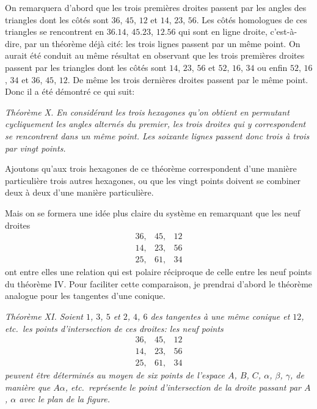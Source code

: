 \documentclass[12pt,a4paper]{article}
\theoremstyle{plain}
\begin{document}
On remarquera d'abord que les trois premi\`eres droites passent par les angles des triangles dont les c\^ot\'es sont $36$, $45$, $12$ et $14$, $23$, $56$. Les c\^ot\'es homologues de ces triangles se rencontrent en $36.14$, $45.23$, $12.56$ qui sont en ligne droite, c'est-\`a-dire, par un th\'eor\`eme d\'ej\`a cit\'e: les trois lignes passent par un m\^eme point. On aurait \'et\'e conduit au m\^eme r\'esultat en observant que les trois premi\`eres droites passent par les triangles dont les c\^ot\'es sont $14$, $23$, $56$ et $52$, $16$, $34$ ou enfin $52$, $16$, $34$ et $36$, $45$, $12$. De m\^eme les trois derni\`eres droites passent par le m\^eme point. Donc il a \'et\'e d\'emontr\'e ce qui suit:

\smallskip
\textit{Th\'eor\`eme X. En consid\'erant les trois hexagones qu'on obtient en permutant cycliquement les angles altern\'es du premier, les trois droites qui y correspondent se rencontrent dans un m\^eme point. Les soixante lignes passent donc trois \`a trois par vingt points.}
\smallskip

Ajoutons qu'aux trois hexagones de ce th\'eor\`eme correspondent d'une mani\`ere particuli\`ere trois autres hexagones, ou que les vingt points doivent se combiner deux \`a deux d'une mani\`ere particuli\`ere.

Mais on se formera une id\'ee plus claire du syst\`eme en remarquant que les neuf droites
\[
\begin{array}{ccc}
36, & 45, & 12 \\
14, & 23, & 56 \\
25, & 61, & 34
\end{array}
\]
ont entre elles une relation qui est polaire r\'eciproque de celle entre les neuf points du th\'eor\`eme IV. Pour faciliter cette comparaison, je prendrai d'abord le th\'eor\`eme analogue pour les tangentes d'une conique.

\smallskip
\textit{Th\'eor\`eme XI. Soient $1$, $3$, $5$ et $2$, $4$, $6$ des tangentes \`a une m\^eme conique et $12$, etc.\ les points d'intersection de ces droites: les neuf points
\[
\begin{array}{ccc}
36, & 45, & 12 \\
14, & 23, & 56 \\
25, & 61, & 34
\end{array}
\]
peuvent \^etre d\'etermin\'es au moyen de six points de l'espace $A$, $B$, $C$, $\alpha$, $\beta$, $\gamma$, de mani\`ere que $A\alpha$, etc.\ repr\'esente le point d'intersection de la droite passant par $A$, $\alpha$ avec le plan de la figure.}
\smallskip
\end{document}

